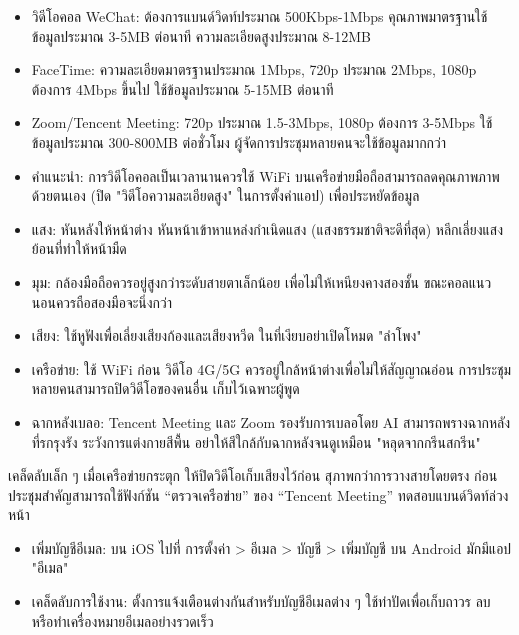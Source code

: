 
\begin{itemize}
  \item วิดีโอคอล WeChat: ต้องการแบนด์วิดท์ประมาณ 500Kbps-1Mbps คุณภาพมาตรฐานใช้ข้อมูลประมาณ 3-5MB ต่อนาที ความละเอียดสูงประมาณ 8-12MB
  \item FaceTime: ความละเอียดมาตรฐานประมาณ 1Mbps, 720p ประมาณ 2Mbps, 1080p ต้องการ 4Mbps ขึ้นไป ใช้ข้อมูลประมาณ 5-15MB ต่อนาที
  \item Zoom/Tencent Meeting: 720p ประมาณ 1.5-3Mbps, 1080p ต้องการ 3-5Mbps ใช้ข้อมูลประมาณ 300-800MB ต่อชั่วโมง ผู้จัดการประชุมหลายคนจะใช้ข้อมูลมากกว่า
  \item คำแนะนำ: การวิดีโอคอลเป็นเวลานานควรใช้ WiFi บนเครือข่ายมือถือสามารถลดคุณภาพภาพด้วยตนเอง (ปิด "วิดีโอความละเอียดสูง" ในการตั้งค่าแอป) เพื่อประหยัดข้อมูล
\end{itemize}


\begin{itemize}
  \item แสง: หันหลังให้หน้าต่าง หันหน้าเข้าหาแหล่งกำเนิดแสง (แสงธรรมชาติจะดีที่สุด) หลีกเลี่ยงแสงย้อนที่ทำให้หน้ามืด
  \item มุม: กล้องมือถือควรอยู่สูงกว่าระดับสายตาเล็กน้อย เพื่อไม่ให้เหนียงคางสองชั้น ขณะคอลแนวนอนควรถือสองมือจะนิ่งกว่า
  \item เสียง: ใช้หูฟังเพื่อเลี่ยงเสียงก้องและเสียงหวีด ในที่เงียบอย่าเปิดโหมด "ลำโพง"
  \item เครือข่าย: ใช้ WiFi ก่อน วิดีโอ 4G/5G ควรอยู่ใกล้หน้าต่างเพื่อไม่ให้สัญญาณอ่อน การประชุมหลายคนสามารถปิดวิดีโอของคนอื่น เก็บไว้เฉพาะผู้พูด
  \item ฉากหลังเบลอ: Tencent Meeting และ Zoom รองรับการเบลอโดย AI สามารถพรางฉากหลังที่รกรุงรัง ระวังการแต่งกายสีพื้น อย่าให้สีใกล้กับฉากหลังจนดูเหมือน "หลุดจากกรีนสกรีน"
\end{itemize}

\begin{tcbinfo}{เคล็ดลับเล็ก ๆ}
เมื่อเครือข่ายกระตุก ให้ปิดวิดีโอเก็บเสียงไว้ก่อน สุภาพกว่าการวางสายโดยตรง ก่อนประชุมสำคัญสามารถใช้ฟังก์ชัน “ตรวจเครือข่าย” ของ “Tencent Meeting” ทดสอบแบนด์วิดท์ล่วงหน้า

\end{tcbinfo}


\begin{itemize}
  \item เพิ่มบัญชีอีเมล: บน iOS ไปที่ การตั้งค่า > อีเมล > บัญชี > เพิ่มบัญชี บน Android มักมีแอป "อีเมล"
  \item เคล็ดลับการใช้งาน: ตั้งการแจ้งเตือนต่างกันสำหรับบัญชีอีเมลต่าง ๆ ใช้ท่าปัดเพื่อเก็บถาวร ลบ หรือทำเครื่องหมายอีเมลอย่างรวดเร็ว
\end{itemize}

